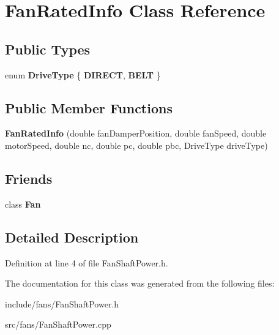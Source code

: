 \hypertarget{class_fan_rated_info}{}\section{Fan\+Rated\+Info Class Reference}
\label{class_fan_rated_info}
\subsection*{Public Types}
\begin{DoxyCompactItemize}
\item 
\mbox{\label{class_fan_rated_info_a7c21fb0107513be5299723f1e1f75a10}} 
enum {\bfseries Drive\+Type} \{ {\bfseries D\+I\+R\+E\+CT}, 
{\bfseries B\+E\+LT}
 \}
\end{DoxyCompactItemize}
\subsection*{Public Member Functions}
\begin{DoxyCompactItemize}
\item 
\mbox{\label{class_fan_rated_info_ae6acf85fdc6865d95a3acc5a1932b4da}} 
{\bfseries Fan\+Rated\+Info} (double fan\+Damper\+Position, double fan\+Speed, double motor\+Speed, double nc, double pc, double pbc, Drive\+Type drive\+Type)
\end{DoxyCompactItemize}
\subsection*{Friends}
\begin{DoxyCompactItemize}
\item 
\mbox{\label{class_fan_rated_info_a0a305abd4183ca4b5d3adb1b563378d7}} 
class {\bfseries Fan}
\end{DoxyCompactItemize}


\subsection{Detailed Description}


Definition at line 4 of file Fan\+Shaft\+Power.\+h.



The documentation for this class was generated from the following files\+:\begin{DoxyCompactItemize}
\item 
include/fans/Fan\+Shaft\+Power.\+h\item 
src/fans/Fan\+Shaft\+Power.\+cpp\end{DoxyCompactItemize}
